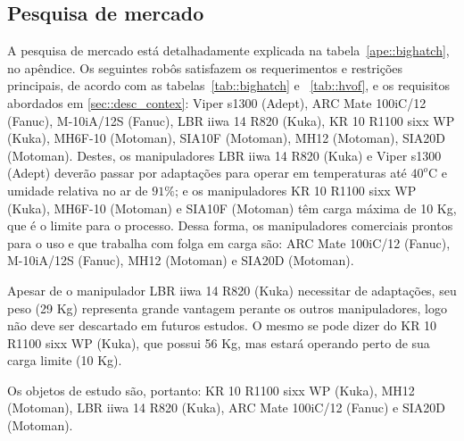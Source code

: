 \subsection{Pesquisa de mercado}
A pesquisa de mercado está detalhadamente explicada na
tabela~\ref{ape::bighatch}, no apêndice. Os seguintes robôs satisfazem os
requerimentos e restrições principais, de acordo com as tabelas~\ref{tab::bighatch} e ~\ref{tab::hvof}, e os requisitos abordados
em \ref{sec::desc_contex}: Viper s1300 (Adept), ARC Mate 100iC/12 (Fanuc),
M-10iA/12S (Fanuc), LBR iiwa 14 R820 (Kuka), KR 10 R1100 sixx WP (Kuka), MH6F-10
(Motoman), SIA10F (Motoman), MH12 (Motoman), SIA20D (Motoman). Destes, os
manipuladores LBR iiwa 14 R820 (Kuka) e Viper s1300 (Adept) deverão passar por adaptações para
operar em temperaturas até $40^o$C e umidade relativa no ar de $91\%$; e os
manipuladores KR 10 R1100 sixx WP (Kuka), MH6F-10
(Motoman) e SIA10F (Motoman) têm carga máxima de 10 Kg, que é o limite para o
processo. Dessa forma, os manipuladores comerciais prontos para o uso e que
trabalha com folga em carga são: ARC Mate 100iC/12 (Fanuc), M-10iA/12S (Fanuc),
MH12 (Motoman) e SIA20D (Motoman).

Apesar de o manipulador LBR iiwa 14 R820 (Kuka) necessitar de adaptações, seu
peso (29 Kg) representa grande vantagem perante os outros manipuladores, logo
não deve ser descartado em futuros estudos. O mesmo se pode dizer do KR 10 R1100
sixx WP (Kuka), que possui 56 Kg, mas estará operando perto de sua carga limite
(10 Kg).

Os objetos de estudo são, portanto: KR 10 R1100
sixx WP (Kuka), MH12 (Motoman), LBR iiwa 14 R820 (Kuka), ARC Mate 100iC/12
(Fanuc) e SIA20D (Motoman).


